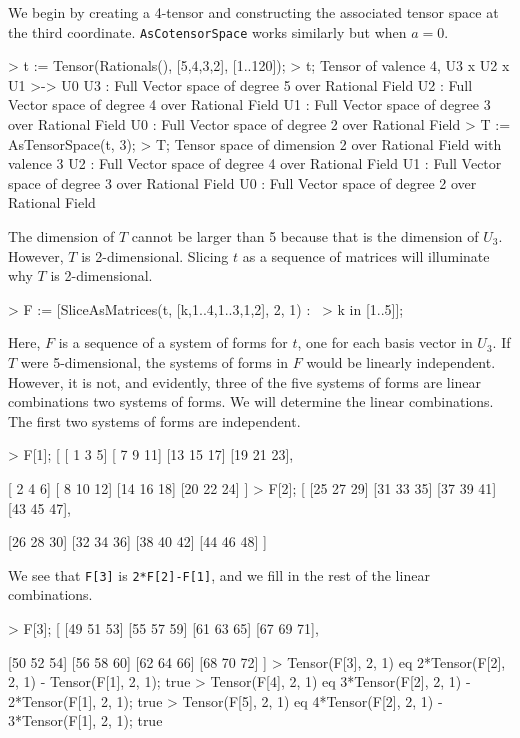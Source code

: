 \begin{example}[TensorsToSpaces]

We begin by creating a 4-tensor and constructing the associated tensor space at
the third coordinate. \texttt{AsCotensorSpace} works similarly but when $a=0$. 
\begin{code}
> t := Tensor(Rationals(), [5,4,3,2], [1..120]);
> t;
Tensor of valence 4, U3 x U2 x U1 >-> U0
U3 : Full Vector space of degree 5 over Rational Field
U2 : Full Vector space of degree 4 over Rational Field
U1 : Full Vector space of degree 3 over Rational Field
U0 : Full Vector space of degree 2 over Rational Field
> T := AsTensorSpace(t, 3);
> T;
Tensor space of dimension 2 over Rational Field with valence 3
U2 : Full Vector space of degree 4 over Rational Field
U1 : Full Vector space of degree 3 over Rational Field
U0 : Full Vector space of degree 2 over Rational Field
\end{code}

The dimension of $T$ cannot be larger than 5 because that is the dimension of
$U_3$. However, $T$ is 2-dimensional. Slicing $t$ as a sequence of matrices will
illuminate why $T$ is 2-dimensional.
\begin{code}
> F := [SliceAsMatrices(t, [{k},{1..4},{1..3},{1,2}], 2, 1) : \
>     k in [1..5]];
\end{code}

Here, $F$ is a sequence of a system of forms for $t$, one for each basis vector
in $U_3$. If $T$ were 5-dimensional, the systems of forms in $F$ would be
linearly independent. However, it is not, and evidently, three of the five
systems of forms are linear combinations two systems of forms. We will determine
the linear combinations. The first two systems of forms are independent.
\begin{code}
> F[1];
[
    [ 1  3  5]
    [ 7  9 11]
    [13 15 17]
    [19 21 23],

    [ 2  4  6]
    [ 8 10 12]
    [14 16 18]
    [20 22 24]
]
> F[2];
[
    [25 27 29]
    [31 33 35]
    [37 39 41]
    [43 45 47],

    [26 28 30]
    [32 34 36]
    [38 40 42]
    [44 46 48]
]
\end{code}

We see that \texttt{F[3]} is \texttt{2*F[2]-F[1]}, and we fill in the rest of the linear combinations.
\begin{code}
> F[3];
[
    [49 51 53]
    [55 57 59]
    [61 63 65]
    [67 69 71],

    [50 52 54]
    [56 58 60]
    [62 64 66]
    [68 70 72]
]
> Tensor(F[3], 2, 1) eq 2*Tensor(F[2], 2, 1) - Tensor(F[1], 2, 1);
true
> Tensor(F[4], 2, 1) eq 3*Tensor(F[2], 2, 1) - 2*Tensor(F[1], 2, 1);
true
> Tensor(F[5], 2, 1) eq 4*Tensor(F[2], 2, 1) - 3*Tensor(F[1], 2, 1);
true
\end{code}


\end{example}
